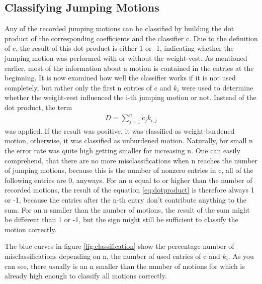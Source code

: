 \documentclass[a4paper]{article}
\begin{document}
\subsection{Classifying Jumping Motions}

Any of the recorded jumping motions can be classified by building the dot product of the corresponding coefficients and the classifier c.
Due to the definition of c, the result of this dot product is either 1 or -1, indicating whether the jumping motion was performed with or without the weight-vest.
As mentioned earlier, most of the information about a motion is contained in the entries at the beginning.
It is now examined how well the classifier works if it is not used completely, but rather only the first n entries of c and $k_{i}$ were used to determine whether the weight-vest influenced the i-th jumping motion or not.
Instead of the dot product, the term
\begin{align}
	D=\sum\limits_{j=1}^n c_{j} k_{i,j} \label{eq:dotproduct}
\end{align} 
was applied. If the result was positive, it was classified as weight-burdened motion, otherwise, it was classified as unburdened motion.
Naturally, for small n the error rate was quite high getting smaller for increasing n.
One can easily comprehend, that there are no more misclassifications when n reaches the number of jumping motions, because this is the number of nonzero entries in c, all of the following entries are 0, anyways.
For an n equal to or higher than the number of recorded motions, the result of the equation \ref{eq:dotproduct} is therefore always 1 or -1, because the entries after the n-th entry don't contribute anything to the sum.
For an n smaller than the number of motions, the result of the sum might be different than 1 or -1, but the sign might still be sufficient to classify the motion correctly.

The blue curves in figure \ref{fig:classification} show the percentage number of misclassifications depending on n, the number of used entries of c and $k_{i}$. As you can see, there usually is an n smaller than the number of motions for which is already high enough to classify all motions correctly.
\end{document}
